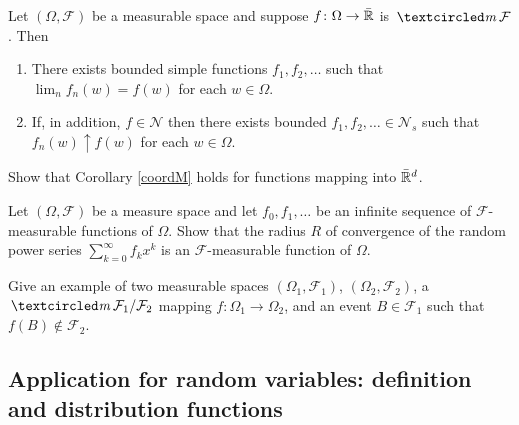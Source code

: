 \begin{theorem}
\label{thm: structure thm}
Let $(\Omega, \mathcal F)$ be a measurable space and suppose $f\colon \Omega\rightarrow \bar{\Bbb R}$ is $\mcirc \mathcal F$. Then
\begin{enumerate}
\item There exists bounded simple functions $f_1, f_2,\ldots $ such that $\lim_n f_n(w)= f(w)$ for each $w\in \Omega$.
\item If, in addition,  $f\in\mathscr N$  then there exists bounded $f_1, f_2, \ldots \in\mathscr N_s$ such that $ f_n(w)\uparrow f(w)$ for each $w\in \Omega$.
\end{enumerate}
\end{theorem}


\begin{exercise} Show that Corollary \ref{coordM} holds for functions mapping into $\bar{\Bbb R}^d$.
\end{exercise}


\begin{exercise}
Let $(\Omega, \mathcal F)$ be a measure space and let $f_0, f_1,\ldots$ be an infinite sequence of $\mathcal F$-measurable functions of $\Omega$. Show that the radius $R$ of convergence of the random power series $\sum_{k=0}^\infty f_k x^k$ is an $\mathcal F$-measurable function of $\Omega$.
\end{exercise}


\begin{exercise}
Give an example of two measurable spaces $(\Omega_1, \mathcal F_1)$,  $(\Omega_2,\mathcal F_2)$, a $\mcirc \mathcal F_1/\mathcal F_2$ mapping $f:\Omega_1\rightarrow \Omega_2$,  and an event $B\in\mathcal F_1$ such that $f(B)\notin \mathcal F_2$.
\end{exercise}


%
%
\subsection{Application for random variables: definition and distribution functions }



